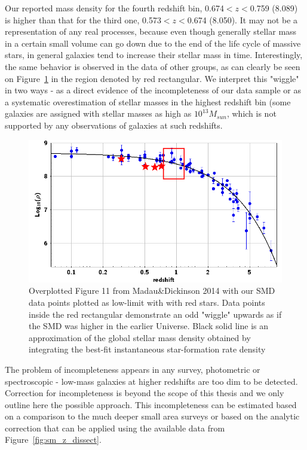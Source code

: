 Our reported mass density for the fourth redshift bin, 0.674$<z<$0.759 (8.089) is higher than that for the third one, 0.573$<z<$0.674 (8.050). It may not be a representation of any real processes, because even though generally stellar mass in a certain small volume can go down due to the end of the life cycle of massive stars, in general galaxies tend to increase their stellar mass in time. Interestingly, the same behavior is observed in the data of other groups, as can clearly be seen on Figure~\ref{fig:gsmd_my} in the region denoted by red rectangular. We interpret this "wiggle" in two ways - as a direct evidence of the incompleteness of our data sample or as a systematic overestimation of stellar masses in the highest redshift bin (some galaxies are assigned with stellar masses as high as $10^{13}M_{sun}$, which is not supported by any observations of galaxies at such redshifts. 

\begin{figure}[!ht]
\includegraphics[width=6in]{Figures/md_plot_my_data_1.png}
\caption{Overplotted Figure 11 from Madau\&Dickinson 2014 with our SMD data points plotted as low-limit with with red stars. Data points inside the red rectangular demonstrate an odd "wiggle" upwards as if the SMD was higher in the earlier Universe. Black solid line is an approximation of the global stellar mass density obtained by integrating the best-fit instantaneous star-formation rate density}
\label{fig:gsmd_my}
\end{figure}

The problem of incompleteness appears in any survey, photometric or spectroscopic - low-mass galaxies at higher redshifts are too dim to be detected. Correction for incompleteness is beyond the scope of this thesis and we only outline here the possible approach. This incompleteness can be estimated based on a comparison to the much deeper small area surveys or based on the analytic correction that can be applied using the available data from Figure~\ref{fig:sm_z_dissect}.

